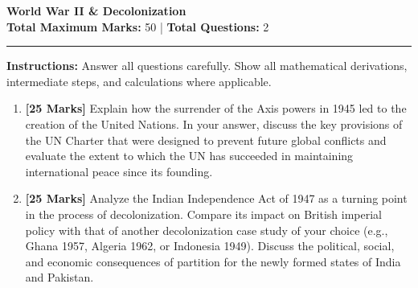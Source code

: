 \documentclass[11pt,a4paper]{article}
\begin{document}
\begin{center}
    {\LARGE \textbf{ World War II & Decolonization }} \\[0.5em]
    \textbf{Total Maximum Marks:} 50 \quad | \quad \textbf{Total Questions:} 2
\end{center}

\vspace{1em}
\hrule
\vspace{1.5em}

\noindent \textbf{Instructions:} Answer all questions carefully. Show all mathematical derivations, intermediate steps, and calculations where applicable.

\vspace{1.5em}

\begin{enumerate}[label=\textbf{Q\arabic*.}, leftmargin=2em]

    \item \textbf{[25 Marks]} Explain how the surrender of the Axis powers in 1945 led to the creation of the United Nations. In your answer, discuss the key provisions of the UN Charter that were designed to prevent future global conflicts and evaluate the extent to which the UN has succeeded in maintaining international peace since its founding.
    
    \vspace{1em}

    \item \textbf{[25 Marks]} Analyze the Indian Independence Act of 1947 as a turning point in the process of decolonization. Compare its impact on British imperial policy with that of another decolonization case study of your choice (e.g., Ghana 1957, Algeria 1962, or Indonesia 1949). Discuss the political, social, and economic consequences of partition for the newly formed states of India and Pakistan.
    
    \vspace{1em}

\end{enumerate}
\end{document}
